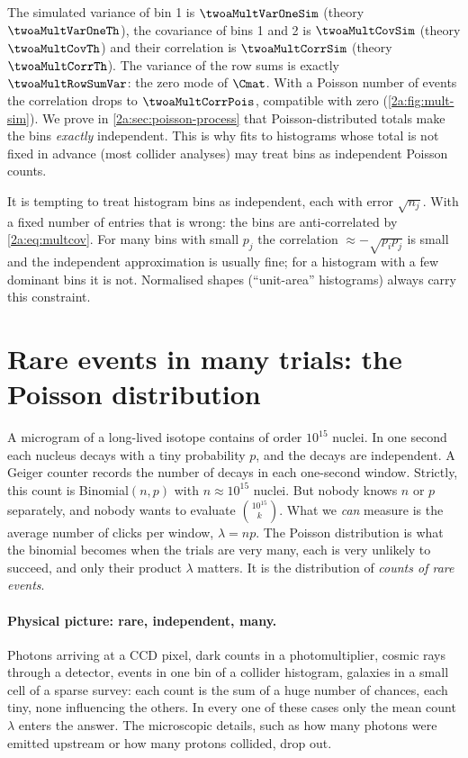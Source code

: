 The simulated variance of bin 1 is $\twoaMultVarOneSim$ (theory $\twoaMultVarOneTh$), the covariance of bins 1 and 2 is $\twoaMultCovSim$ (theory $\twoaMultCovTh$) and their correlation is $\twoaMultCorrSim$ (theory $\twoaMultCorrTh$). The variance of the row sums is exactly $\twoaMultRowSumVar$: the zero mode of $\Cmat$. With a Poisson number of events the correlation drops to $\twoaMultCorrPois$, compatible with zero (\cref{2a:fig:mult-sim}). We prove in \cref{2a:sec:poisson-process} that Poisson-distributed totals make the bins \emph{exactly} independent. This is why fits to histograms whose total is not fixed in advance (most collider analyses) may treat bins as independent Poisson counts.

\begin{pitfall}
It is tempting to treat histogram bins as independent, each with error $\sqrt{n_j}$. With a fixed number of entries that is wrong: the bins are anti-correlated by \eqref{2a:eq:multcov}. For many bins with small $p_j$ the correlation $\approx-\sqrt{p_ip_j}$ is small and the independent approximation is usually fine; for a histogram with a few dominant bins it is not. Normalised shapes (``unit-area'' histograms) always carry this constraint.
\end{pitfall}

\section{Rare events in many trials: the Poisson distribution}\label{2a:sec:poisson-limit}

A microgram of a long-lived isotope contains of order $10^{15}$ nuclei. In one second each nucleus decays with a tiny probability $p$, and the decays are independent. A Geiger counter records the number of decays in each one-second window. Strictly, this count is Binomial$(n,p)$ with $n\approx10^{15}$ nuclei. But nobody knows $n$ or $p$ separately, and nobody wants to evaluate $\binom{10^{15}}{k}$. What we \emph{can} measure is the average number of clicks per window, $\lambda=np$. The Poisson distribution is what the binomial becomes when the trials are very many, each is very unlikely to succeed, and only their product $\lambda$ matters. It is the distribution of \emph{counts of rare events}.

\paragraph{Physical picture: rare, independent, many.}
Photons arriving at a CCD pixel, dark counts in a photomultiplier, cosmic rays through a detector, events in one bin of a collider histogram, galaxies in a small cell of a sparse survey: each count is the sum of a huge number of chances, each tiny, none influencing the others. In every one of these cases only the mean count $\lambda$ enters the answer. The microscopic details, such as how many photons were emitted upstream or how many protons collided, drop out.

